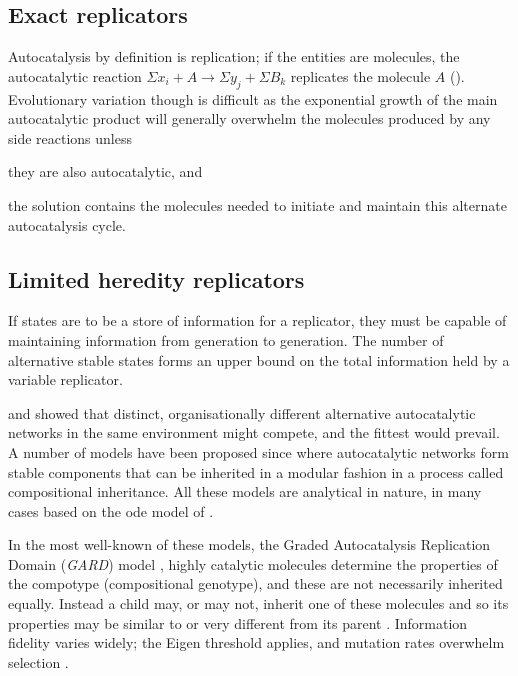 \subsection{Exact replicators}\label{non-informational-exact-replicators}

Autocatalysis by definition is replication; if the entities are molecules, the autocatalytic reaction $\Sigma x_i + A\rightarrow \Sigma y_j + \Sigma B_k$ replicates the molecule $A$ (\eg \textcite{Lifson1997}). Evolutionary variation though is difficult as the exponential growth of the main autocatalytic product will generally overwhelm the molecules produced by any side reactions unless \begin{inparaenum}\item they are also autocatalytic, and \item the solution contains the molecules needed to initiate and maintain this alternate autocatalysis cycle.\end{inparaenum}

\subsection{Limited heredity replicators}\label{variable-replicators}

If states are to be a store of information for a replicator, they must be capable of maintaining information from generation to generation. The number of alternative stable states forms an upper bound on the total information held by a variable replicator.

\Textcite{Ganti:2003hl} and  \textcite{Eigen1971} showed that distinct, organisationally different alternative autocatalytic networks in the same environment might compete, and the fittest would prevail. A number of models have been proposed since where autocatalytic networks form stable components that can be inherited in a modular fashion in a process called compositional inheritance. All these models are analytical in nature, in many cases based on the \gls{ode} model of \cite{Farmer1986}.


In the most well-known of these models, the Graded Autocatalysis Replication Domain (\emph{GARD}) model \parencite{Segre1998}, highly catalytic molecules determine the properties of the compotype (compositional genotype), and these are not necessarily inherited equally. Instead a child may, or may not, inherit one of these molecules and so its properties may be similar to or very different from its parent \parencite{Vasas2015, Vasas2012, Vasas2012a}. Information fidelity varies widely; the Eigen threshold \parencite{Eigen1971} applies, and mutation rates overwhelm selection \parencite{Vasas2015, Vasas2012, Vasas2012a}.

